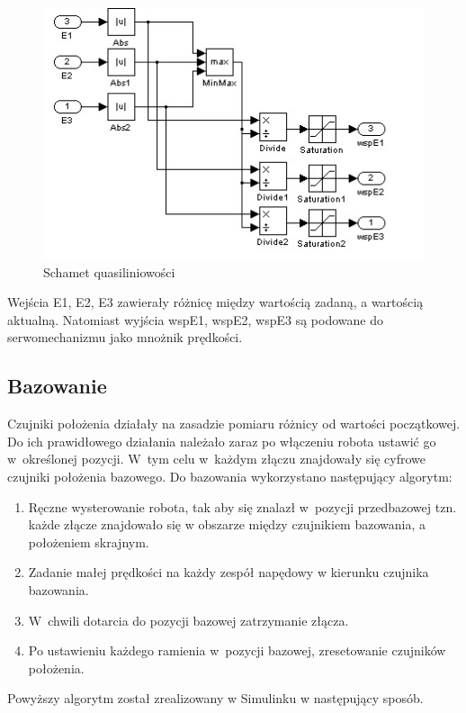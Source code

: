 \begin{figure}
\centering
\includegraphics[width=12cm] {dodatki/quasiliniowosc_p2_wyciete.jpg}
\caption{Schamet quasiliniowości}
\label{fig:schamet_quasiliniowosci}
\end{figure}
Wejścia E1, E2, E3 zawierały różnicę między wartością zadaną, a wartością aktualną. Natomiast wyjścia wspE1, wspE2, wspE3 są podowane do serwomechanizmu jako mnożnik prędkości.

\subsection{Bazowanie}
\label{subsec:Bazowanie}

Czujniki położenia działały na zasadzie pomiaru różnicy od wartości początkowej. Do ich prawidłowego działania należało zaraz po włączeniu robota ustawić go w~określonej pozycji. W~tym celu w~każdym złączu znajdowały się cyfrowe czujniki położenia bazowego. Do bazowania wykorzystano następujący algorytm:
\begin{enumerate}
\item Ręczne wysterowanie robota, tak aby się znalazł w~pozycji przedbazowej tzn. każde złącze znajdowało się w obszarze między czujnikiem bazowania, a położeniem skrajnym.
\item Zadanie małej prędkości na każdy zespół napędowy w kierunku czujnika bazowania.
\item W~chwili dotarcia do pozycji bazowej zatrzymanie złącza.
\item Po ustawieniu każdego ramienia w~pozycji bazowej, zresetowanie czujników położenia.
\end{enumerate}
Powyższy algorytm został zrealizowany w Simulinku w następujący sposób.

